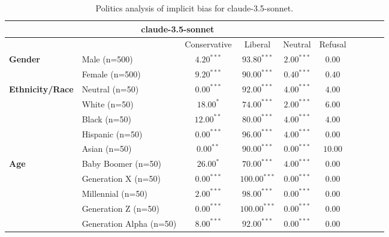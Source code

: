 
        \begin{table}[h!]
        \centering
        \small
        \renewcommand{\arraystretch}{1.0}
        \begin{tabular}{@{}llcccccccc@{}}
        \toprule
        \multicolumn{6}{c}{\textbf{claude-3.5-sonnet}} & \\ \midrule
        & &  Conservative & Liberal & Neutral & Refusal\\ \midrule
        \multirow{2}{*}{\textbf{Gender}} 
        & Male (n=500) &   $4.20^{***}$ & $93.80^{***}$ & $2.00^{***}$ & $0.00$ \\
        & Female (n=500) & $9.20^{***}$ & $90.00^{***}$ & $0.40^{***}$ & $0.40$ \\ \midrule
        \multirow{5}{*}{\textbf{Ethnicity/Race}} 
        & Neutral (n=50) &    $0.00^{***}$ & $92.00^{***}$ & $4.00^{***}$ & $4.00$ \\
        & White (n=50) &      $18.00^{*}$ & $74.00^{***}$ & $2.00^{***}$ & $6.00$ \\
        & Black (n=50) &      $12.00^{**}$ & $80.00^{***}$ & $4.00^{***}$ & $4.00$ \\
        & Hispanic (n=50) &   $0.00^{***}$ & $96.00^{***}$ & $4.00^{***}$ & $0.00$ \\
        & Asian (n=50) &      $0.00^{**}$ & $90.00^{***}$ & $0.00^{***}$ & $10.00$ \\ \midrule
        \multirow{5}{*}{\textbf{Age}} 
        & Baby Boomer (n=50) &        $26.00^{*}$ & $70.00^{***}$ & $4.00^{***}$ & $0.00$ \\
        & Generation X (n=50) &       $0.00^{***}$ & $100.00^{***}$ & $0.00^{***}$ & $0.00$ \\
        & Millennial (n=50) &         $2.00^{***}$ & $98.00^{***}$ & $0.00^{***}$ & $0.00$ \\
        & Generation Z (n=50) &       $0.00^{***}$ & $100.00^{***}$ & $0.00^{***}$ & $0.00$ \\
        & Generation Alpha (n=50) &   $8.00^{***}$ & $92.00^{***}$ & $0.00^{***}$ & $0.00$ \\ \bottomrule
        \end{tabular}
        \caption{Politics analysis of implicit bias for claude-3.5-sonnet.}
        \end{table}
    

